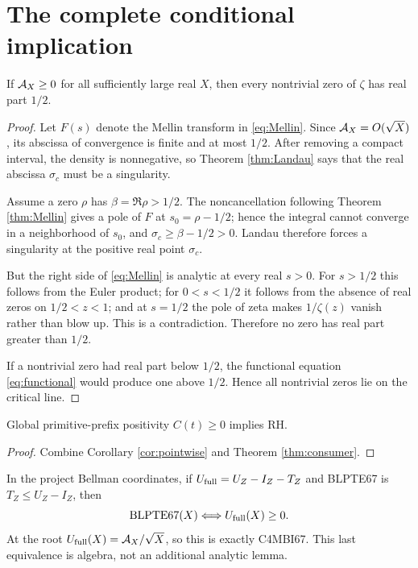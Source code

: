 \section{The complete conditional implication}

\begin{theorem}\label{thm:consumer}
If $\mathcal A_X\ge0$ for all sufficiently large real $X$, then every nontrivial zero
of $\zeta$ has real part $1/2$.
\end{theorem}
\begin{proof}
Let $F(s)$ denote the Mellin transform in \eqref{eq:Mellin}.  Since
$\mathcal A_X=O(\sqrt X)$, its abscissa of convergence is finite and at most $1/2$.
After removing a compact interval, the density is nonnegative, so Theorem
\ref{thm:Landau} says that the real abscissa $\sigma_c$ must be a singularity.

Assume a zero $\rho$ has $\beta=\Re\rho>1/2$.  The noncancellation following
Theorem \ref{thm:Mellin} gives a pole of $F$ at $s_0=\rho-1/2$; hence the
integral cannot converge in a neighborhood of $s_0$, and
$\sigma_c\ge\beta-1/2>0$.  Landau therefore forces a singularity at the
positive real point $\sigma_c$.

But the right side of \eqref{eq:Mellin} is analytic at every real $s>0$.
For $s>1/2$ this follows from the Euler product; for $0<s<1/2$ it follows from
the absence of real zeros on $1/2<z<1$; and at $s=1/2$ the pole of zeta makes
$1/\zeta(z)$ vanish rather than blow up.  This is a contradiction.  Therefore
no zero has real part greater than $1/2$.

If a nontrivial zero had real part below $1/2$, the functional equation
\eqref{eq:functional} would produce one above $1/2$.  Hence all nontrivial
zeros lie on the critical line.
\end{proof}

\begin{corollary}
Global primitive-prefix positivity $C(t)\ge0$ implies RH.
\end{corollary}
\begin{proof}
Combine Corollary \ref{cor:pointwise} and Theorem \ref{thm:consumer}.
\end{proof}

In the project Bellman coordinates, if
$U_{\rm full}=U_Z-I_Z-T_Z$ and BLPTE67 is
$T_Z\le U_Z-I_Z$, then
\[
 \mathrm{BLPTE67}(X)\Longleftrightarrow U_{\rm full}(X)\ge0.
\]
At the root $U_{\rm full}(X)=\mathcal A_X/\sqrt X$, so this is exactly C4MBI67.  This
last equivalence is algebra, not an additional analytic lemma.

